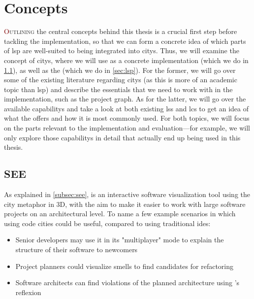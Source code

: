 \documentclass[../thesis]{subfiles}
\begin{document}
\chapter{Concepts}\label{ch:concepts}

\lettrine[lines=3]{\textcolor{Maroon}{O}}{utlining} the central concepts behind this thesis is a crucial first step before tackling the implementation, so that we can form a concrete idea of which parts of \gls{lsp} are well-suited to being integrated into \glspl{city}.
Thus, we will examine the concept of \glspl{city}, where we will use \SEE{} as a concrete implementation (which we do in \cref{sec:see}), as well as the  (which we do in \cref{sec:lsp}).
For the former, we will go over some of the existing literature regarding \glspl{city} (as this is more of an academic topic than \gls{lsp}) and describe the essentials that we need to work with in the implementation, such as the project graph.
As for the latter, we will go over the available \glspl{capability} and take a look at both existing \glspl{ls} and \glspl{lc} to get an idea of what the  offers and how it is most commonly used.
For both topics, we will focus on the parts relevant to the implementation and evaluation---for example, we will only explore those \glspl{capability} in detail that actually end up being used in this thesis.

\section{SEE}\label{sec:see}

As explained in \cref{subsec:see}, \SEE{} is an interactive software visualization tool using the \gls{city} metaphor in 3D, with the aim to make it easier to work with large software projects on an architectural level.
To name a few example scenarios in which using code cities could be useful, compared to using traditional \glspl{ide}:
\begin{itemize}
	\item Senior developers may use it in its "multiplayer" mode to explain the structure of their software to newcomers
	\item Project planners could visualize \glspl{smell} to find candidates for refactoring~\cite{galperin2021}
	\item Software architects can find violations of the planned architecture using \SEE{}'s \gls{reflexion}
\end{itemize}
\end{document}
